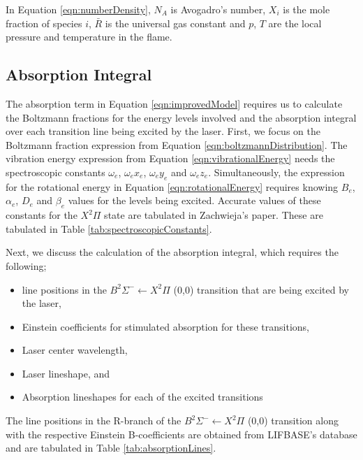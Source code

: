 In Equation \ref{eqn:numberDensity}, \(N_A\) is Avogadro's number, \(X_i\) is the mole fraction of species \(i\), \(\bar{R}\) is the universal gas constant and \(p\), \(T\) are the local pressure and temperature in the flame.


\subsection{Absorption Integral}

The absorption term in Equation \ref{eqn:improvedModel} requires us to calculate the Boltzmann fractions for the energy levels involved and the absorption integral over each transition line being excited by the laser.
First, we focus on the Boltzmann fraction expression from Equation \ref{eqn:boltzmannDistribution}.
The vibration energy expression from Equation \ref{eqn:vibrationalEnergy} needs the spectroscopic constants \(\omega_e\), \(\omega_e x_e\), \(\omega_e y_e\) and \(\omega_e z_e\).
Simultaneously, the expression for the rotational energy in Equation \ref{eqn:rotationalEnergy} requires knowing \(B_e\), \(\alpha_e\), \(D_e\) and \(\beta_e\) values for the levels being excited.
Accurate values of these constants for the \(X^2\Pi\) state are tabulated in Zachwieja's\cite{1995-zachwieja} paper.
These are tabulated in Table \ref{tab:spectroscopicConstants}.



Next, we discuss the calculation of the absorption integral, which requires the following;

\begin{itemize}
  \item line positions in the \(B^2\Sigma^-\leftarrow X^2\Pi\) (0,0) transition that are being excited by the laser,
  \item Einstein coefficients for stimulated absorption for these transitions,
  \item Laser center wavelength,
  \item Laser lineshape, and
  \item Absorption lineshapes for each of the excited transitions
\end{itemize}

The line positions in the R-branch of the \(B^2\Sigma^-\leftarrow X^2\Pi\) (0,0) transition along with the respective Einstein B-coefficients are obtained from LIFBASE's database and are tabulated in Table \ref{tab:absorptionLines}.

